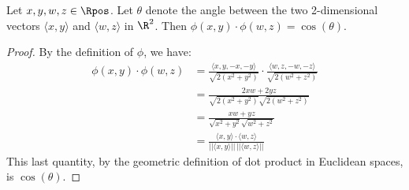 

\begin{proposition}
    \label{prop:theta}
    Let $x, y, w, z \in \Rpos$. Let $\theta$ denote the angle between the two 2-dimensional vectors $\langle x, y \rangle$ and $\langle w, z \rangle$ in $\R^2$. Then $\phi(x, y) \cdot \phi(w, z) = \cos(\theta)$.
\end{proposition}

\begin{proof}
    By the definition of $\phi$, we have:
    \begin{align*}
        \phi(x, y) \cdot \phi(w, z)
          & = \frac{\langle x, y, -x, -y \rangle}{\sqrt{2(x^2 + y^2)}} \cdot \frac{\langle w, z, -w, -z \rangle}{\sqrt{2(w^2 + z^2)}} \\
          & = \frac{2xw + 2yz}{\sqrt{2(x^2 + y^2)} \sqrt{2(w^2 + z^2)}} \\
          & = \frac{xw + yz}{\sqrt{x^2 + y^2} \sqrt{w^2 + z^2}} \\
          & = \frac{\langle x, y \rangle \cdot \langle w, z \rangle}{|| \langle x, y \rangle || \, || \langle w, z \rangle ||}
    \end{align*}
    This last quantity, by the geometric definition of dot product in Euclidean spaces, is $\cos(\theta)$.
\end{proof}

